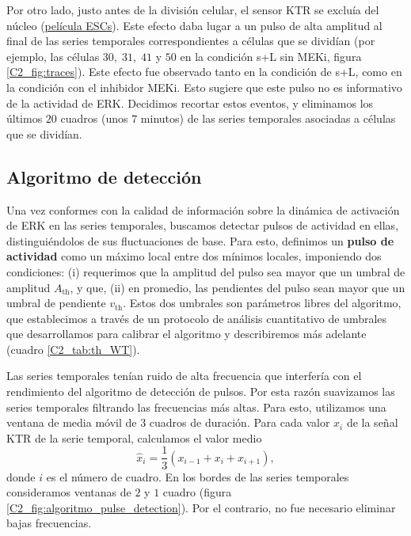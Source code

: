 \documentclass[./main.tex]{subfiles}
\begin{document}
Por otro lado, justo antes de la división celular, el sensor KTR se excluía del núcleo (\href{http://movie.biologists.com/video/10.1242/dev.199710/video-1}{película ESCs}). Este efecto daba lugar a un pulso de alta amplitud al final de las series temporales correspondientes a células que se dividían (por ejemplo, las células $30,\; 31,\; 41$ y $50$ en la condición s+L sin MEKi, figura \ref{C2_fig:traces}). Este efecto fue observado tanto en la condición de s+L, como en la condición con el inhibidor MEKi. Esto sugiere que este pulso no es informativo de la actividad de ERK. Decidimos recortar estos eventos, y eliminamos los últimos $20$ cuadros (unos $7$ minutos) de las series temporales asociadas a células que se dividían. 


\subsection{Algoritmo de detección}
\label{C2_ssec:algoritmo}

Una vez conformes con la calidad de información sobre la dinámica de activación de ERK en las series temporales, buscamos detectar pulsos de actividad en ellas, distinguiéndolos de sus fluctuaciones de base. Para esto, definimos un \textbf{pulso de actividad} como un máximo local entre dos mínimos locales, imponiendo dos condiciones: (i) requerimos que la amplitud del pulso sea mayor que un umbral de amplitud $A_{\text{th}}$, y que, (ii) en promedio, las pendientes del pulso sean mayor que un umbral de pendiente $v_{\text{th}}$. Estos dos umbrales son parámetros libres del algoritmo, que establecimos a través de un protocolo de análisis cuantitativo de umbrales que desarrollamos para calibrar el algoritmo y describiremos más adelante (cuadro \ref{C2_tab:th_WT}). 


Las series temporales tenían ruido de alta frecuencia que interfería con el rendimiento del algoritmo de detección de pulsos. Por esta razón suavizamos las series temporales filtrando las frecuencias más altas. Para esto, utilizamos una ventana de media móvil de $3$ cuadros de duración. Para cada valor $x_i$ de la señal KTR de la serie temporal, calculamos el valor medio 
\begin{equation}
    \hat{x}_i = \frac{1}{3} ( x_{i-1} + x_{i} + x_{i+1} ) ,
\end{equation}
donde $i$ es el número de cuadro. En los bordes de las series temporales consideramos ventanas de $2$ y $1$ cuadro (figura \ref{C2_fig:algoritmo_pulse_detection}). Por el contrario, no fue necesario eliminar bajas frecuencias. 
\end{document}
